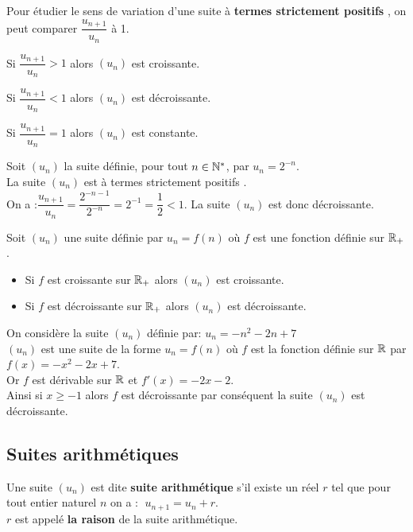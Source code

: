 \begin{methode}

 Pour étudier le sens de variation d'une suite à \textbf {termes strictement positifs } , on peut comparer $ \dfrac{u_{n+1}}{u_{n}} $   à 1.

Si $ \dfrac{u_{n+1}}{u_{n}}>1 $ alors $(u_{n})$ est croissante.

Si $ \dfrac{u_{n+1}}{u_{n}}<1 $ alors $(u_{n})$ est décroissante.

Si $ \dfrac{u_{n+1}}{u_{n}}=1 $ alors $(u_{n})$ est constante.
\end{methode}
\begin{example}

Soit $(u_{n})$ la suite définie, pour tout $n\in \mathbb{N}^* $, par $ u_{n}=2^{-n} $.\\ La suite $(u_{n})$ est à termes strictement positifs .\\
On a :$ \dfrac{u_{n+1}}{u_{n}}=\dfrac{2^{-n-1}}{2^{-n}}=2^{-1}=\dfrac{1}{2}<1 $.
 La suite  $(u_{n})$  est donc décroissante.
\end{example}
\begin{methode}
Soit $(u_{n})$ une suite définie par $ u_{n} = f (n) $ où $f$ est une fonction définie sur $ \mathbb{R}_+ $.
\begin{itemize}
\item[\textbullet] Si $ f $ est croissante sur $ \mathbb{R}_+ $ alors $(u_{n})$ est croissante.
 \item[\textbullet] Si $ f $ est décroissante  sur $ \mathbb{R}_+ $ alors $(u_{n})$ est décroissante.
\end{itemize}
\end{methode}
\begin{example}

On considère la suite $(u_{n})$  définie par:\; $ u_n=-n^{2}-2n+7 $\\
$(u_{n})$  est une suite de la forme \; $ u_{n} = f (n) $ où $f$ est la fonction définie sur $ \mathbb{R} $  par $ f(x)=-x^{2}-2x+7 $. \\ Or $ f $  est dérivable sur $ \mathbb{R} $ et $ f'(x)=-2x-2 $.\\Ainsi si $ x\geq -1 $ alors $ f $ est décroissante par conséquent la suite  $(u_{n})$  est décroissante.
\end{example}

\subsection{Suites arithmétiques}
\begin{definition}

Une suite $(u_{n})$ est dite   \textbf{suite arithmétique} s'il existe un réel $ r $ tel que   pour tout entier naturel $n$ on a :   $\; u_{n+1}=u_{n}+r $.\\
$r$ est appelé  \textbf{la raison} de la suite arithmétique.
\end{definition}

